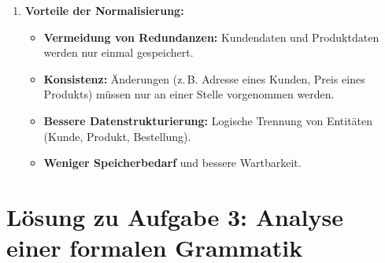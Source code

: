 \documentclass[a4paper,12pt]{article}
\begin{document}
\begin{enumerate}
		\item \textbf{Vorteile der Normalisierung:}
		\begin{itemize}
			\item \textbf{Vermeidung von Redundanzen:} Kundendaten und Produktdaten werden nur einmal gespeichert.
			\item \textbf{Konsistenz:} Änderungen (z.\,B. Adresse eines Kunden, Preis eines Produkts) müssen nur an einer Stelle vorgenommen werden.
			\item \textbf{Bessere Datenstrukturierung:} Logische Trennung von Entitäten (Kunde, Produkt, Bestellung).
			\item \textbf{Weniger Speicherbedarf} und bessere Wartbarkeit.
		\end{itemize}
	\end{enumerate}
	
\section*{Lösung zu Aufgabe 3: Analyse einer formalen Grammatik}
\end{document}
